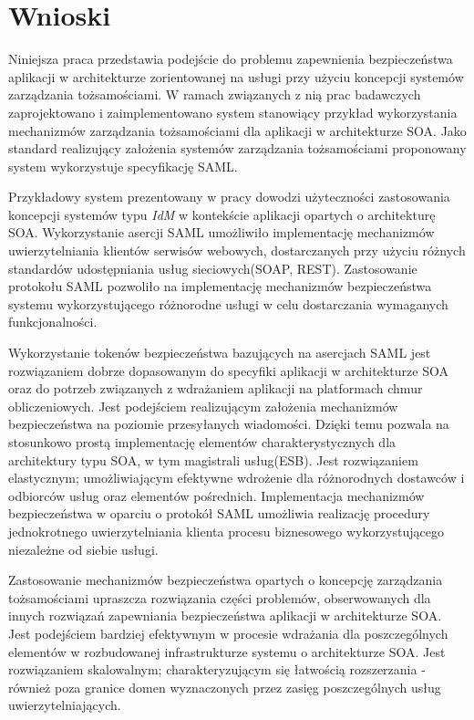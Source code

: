 \chapter{Wnioski}
\label{cha:wnioski}

Niniejsza praca przedstawia podejście do problemu zapewnienia bezpieczeństwa aplikacji w architekturze zorientowanej na usługi przy użyciu koncepcji systemów zarządzania tożsamościami. W ramach związanych z nią prac badawczych zaprojektowano i zaimplementowano system stanowiący przykład wykorzystania mechanizmów zarządzania tożsamościami dla aplikacji w architekturze SOA. Jako standard realizujący założenia systemów zarządzania tożsamościami proponowany system wykorzystuje specyfikację SAML. 

Przykładowy system prezentowany w pracy dowodzi użyteczności zastosowania koncepcji systemów typu \textit{IdM} w kontekście aplikacji opartych o architekturę SOA. Wykorzystanie asercji SAML umożliwiło implementację mechanizmów uwierzytelniania klientów serwisów webowych, dostarczanych przy użyciu różnych standardów udostępniania usług sieciowych(SOAP, REST). Zastosowanie protokołu SAML pozwoliło na implementację mechanizmów bezpieczeństwa systemu wykorzystującego różnorodne usługi w celu dostarczania wymaganych funkcjonalności. 

Wykorzystanie tokenów bezpieczeństwa bazujących na asercjach SAML jest rozwiązaniem dobrze dopasowanym do specyfiki aplikacji w architekturze SOA oraz do potrzeb związanych z wdrażaniem aplikacji na platformach chmur obliczeniowych. Jest podejściem realizującym założenia mechanizmów bezpieczeństwa na poziomie przesyłanych wiadomości. Dzięki temu pozwala na stosunkowo prostą implementację elementów charakterystycznych dla architektury typu SOA, w tym magistrali usług(ESB). Jest rozwiązaniem elastycznym; umożliwiającym efektywne wdrożenie dla różnorodnych dostawców i odbiorców usług oraz elementów pośrednich. Implementacja mechanizmów bezpieczeństwa w oparciu o protokół SAML umożliwia realizację procedury jednokrotnego uwierzytelniania klienta procesu biznesowego wykorzystującego niezależne od siebie usługi.

Zastosowanie mechanizmów bezpieczeństwa opartych o koncepcję zarządzania tożsamościami upraszcza rozwiązania części problemów, obserwowanych dla innych rozwiązań zapewniania bezpieczeństwa aplikacji w architekturze SOA. Jest podejściem bardziej efektywnym w procesie wdrażania dla poszczególnych elementów w rozbudowanej infrastrukturze systemu o architekturze SOA. Jest rozwiązaniem skalowalnym; charakteryzującym się łatwością rozszerzania - również poza granice domen wyznaczonych przez zasięg poszczególnych usług uwierzytelniających.

